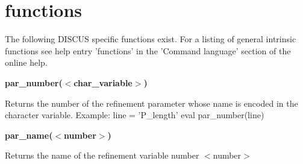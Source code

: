 \section{functions}
\par
The following DISCUS specific functions exist. For a listing 
of general intrinsic functions see help entry 'functions' in 
the 'Command language' section of the online help. 
\par
{\bf par\_number($ <$char\_variable$> $) \par }
\par
\vspace{3pt}
Returns the number of the refinement parameter whose name is 
encoded in the character variable. 
Example: 
line = 'P\_length' 
eval par\_number(line) 
\par
{\bf par\_name($ <$number$> $) \par }
\par
\vspace{3pt}
Returns the name of the refinement variable number $ <$number$> $ 
